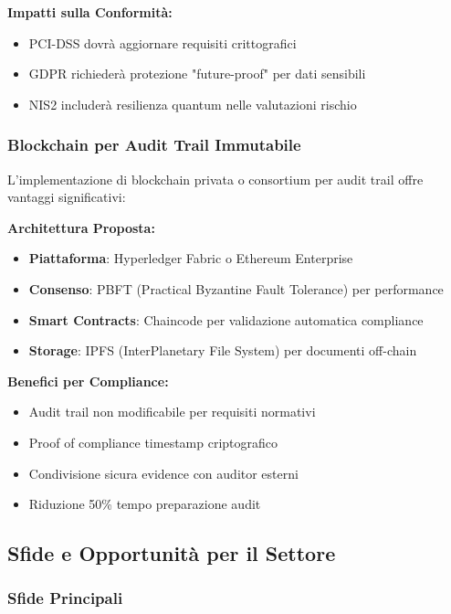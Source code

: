 \textbf{Impatti sulla Conformità:}
\begin{itemize}
    \item PCI-DSS dovrà aggiornare requisiti crittografici
    \item GDPR richiederà protezione "future-proof" per dati sensibili
    \item NIS2 includerà resilienza quantum nelle valutazioni rischio
\end{itemize}

\subsubsection{\texorpdfstring{Blockchain per Audit Trail Immutabile}{4.8.3.2 - Blockchain per Audit Trail Immutabile}}

L'implementazione di blockchain privata o consortium per audit trail offre vantaggi significativi:

\textbf{Architettura Proposta:}
\begin{itemize}
    \item \textbf{Piattaforma}: Hyperledger Fabric o Ethereum Enterprise
    \item \textbf{Consenso}: PBFT (Practical Byzantine Fault Tolerance) per performance
    \item \textbf{Smart Contracts}: Chaincode per validazione automatica compliance
    \item \textbf{Storage}: IPFS (InterPlanetary File System) per documenti off-chain
\end{itemize}

\textbf{Benefici per Compliance:}
\begin{itemize}
    \item Audit trail non modificabile per requisiti normativi
    \item Proof of compliance timestamp criptografico
    \item Condivisione sicura evidence con auditor esterni
    \item Riduzione 50\% tempo preparazione audit
\end{itemize}

\subsection{\texorpdfstring{Sfide e Opportunità per il Settore}{4.8.4 - Sfide e Opportunità per il Settore}}

\subsubsection{\texorpdfstring{Sfide Principali}{4.8.4.1 - Sfide Principali}}

